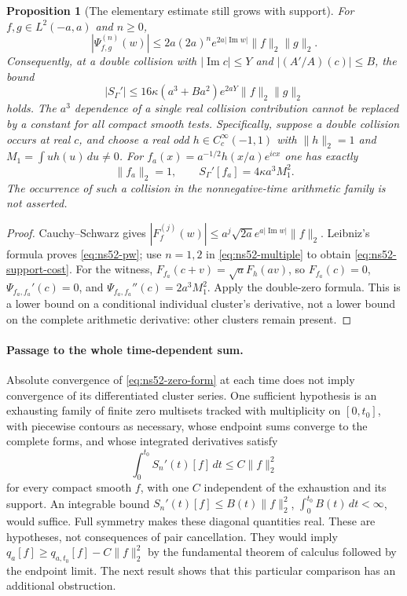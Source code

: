 \documentclass[11pt]{article}
\newtheorem{proposition}[theorem]{Proposition}
\theoremstyle{remark}
\begin{document}
\begin{proposition}[The elementary estimate still grows with support]
\label{prop:ns52-support}
For $f,g\in L^2(-a,a)$ and $n\ge0$,
\begin{equation}\label{eq:ns52-pw}
 |\Psi_{f,g}^{(n)}(w)|
 \le 2a(2a)^n e^{2a|\operatorname{Im}w|}\|f\|_2\|g\|_2.
\end{equation}
Consequently, at a double collision with
$|\operatorname{Im}c|\le Y$ and $|(A'/A)(c)|\le B$, the bound
\begin{equation}\label{eq:ns52-support-cost}
 |S_\Gamma'|
 \le16\kappa(a^3+Ba^2)e^{2aY}\|f\|_2\|g\|_2
\end{equation}
holds. The $a^3$ dependence of a single real collision contribution
cannot be replaced by a constant for all compact smooth tests.
Specifically, suppose a double collision occurs at real $c$, and
choose a real odd $h\in C_c^\infty(-1,1)$ with $\|h\|_2=1$ and
$M_1=\int u h(u)\,du\ne0$. For
$f_a(x)=a^{-1/2}h(x/a)e^{icx}$ one has exactly
\begin{equation}\label{eq:ns52-collision-witness}
 \|f_a\|_2=1,\qquad
 S_\Gamma'[f_a]=4\kappa a^3 M_1^2.
\end{equation}
The occurrence of such a collision in the nonnegative-time arithmetic
family is not asserted.
\end{proposition}
\begin{proof}
Cauchy--Schwarz gives
$|F_f^{(j)}(w)|\le a^j\sqrt{2a}e^{a|\operatorname{Im}w|}\|f\|_2$.
Leibniz's formula proves \eqref{eq:ns52-pw}; use $n=1,2$ in
\eqref{eq:ns52-multiple} to obtain \eqref{eq:ns52-support-cost}.
For the witness, $F_{f_a}(c+v)=\sqrt a F_h(av)$, so
$F_{f_a}(c)=0$, $\Psi_{f_a,f_a}'(c)=0$, and
$\Psi_{f_a,f_a}''(c)=2a^3M_1^2$. Apply the double-zero formula.
This is a lower bound on a conditional individual cluster's derivative,
not a lower bound on the complete arithmetic derivative: other clusters
remain present.
\end{proof}

\paragraph{Passage to the whole time-dependent sum.}
Absolute convergence of \eqref{eq:ns52-zero-form} at each time
does not imply convergence of its differentiated cluster series.
One sufficient hypothesis is an exhausting family of finite zero
multisets tracked with multiplicity on $[0,t_0]$, with piecewise
contours as necessary, whose endpoint sums converge to the complete
forms, and whose integrated derivatives satisfy
\[
 \int_0^{t_0}S_n'(t)[f]\,dt\le C\|f\|_2^2
\]
for every compact smooth $f$, with one $C$ independent of the
exhaustion and its support. An integrable bound
$S_n'(t)[f]\le B(t)\|f\|_2^2$, $\int_0^{t_0}B(t)\,dt<\infty$,
would suffice. Full symmetry makes these diagonal quantities real.
These are hypotheses, not consequences of pair cancellation. They
would imply $q_a[f]\ge q_{a,t_0}[f]-C\|f\|_2^2$ by the fundamental
theorem of calculus followed by the endpoint limit. The next result
shows that this particular comparison has an additional obstruction.
\end{document}
